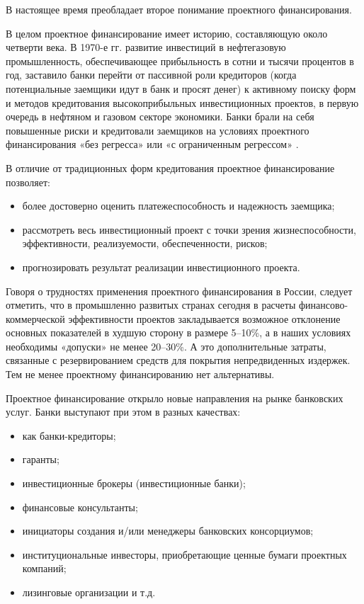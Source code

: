 В настоящее время преобладает второе понимание проектного финансирования.

В целом проектное финансирование имеет историю, составляющую около четверти века.
В 1970-е гг. развитие инвестиций в нефтегазовую промышленность, обеспечивающее прибыльность в сотни и тысячи процентов в год, заставило банки перейти от пассивной роли кредиторов (когда потенциальные заемщики идут в банк и просят денег) к активному поиску форм и методов кредитования высокоприбыльных инвестиционных проектов, в первую очередь в нефтяном и газовом секторе экономики.
Банки брали на себя повышенные риски и кредитовали заемщиков на условиях проектного финансирования «без регресса» или «с ограниченным регрессом» \cite[289--291]{mazur}.

В отличие от традиционных форм кредитования проектное финансирование позволяет:
\begin{itemize}
	\item более достоверно оценить платежеспособность и надежность заемщика;
	\item рассмотреть весь инвестиционный проект с точки зрения жизнеспособности, эффективности, реализуемости, обеспеченности, рисков;
	\item прогнозировать результат реализации инвестиционного проекта.
\end{itemize}

Говоря о трудностях применения проектного финансирования в России, следует отметить, что в промышленно развитых странах сегодня в расчеты финансово-коммерческой эффективности проектов закладывается возможное отклонение основных показателей в худшую сторону в размере 5--10\%, а в наших условиях необходимы «допуски» не менее 20--30\%.
А это дополнительные затраты, связанные с резервированием средств для покрытия непредвиденных издержек.
Тем не менее проектному финансированию нет альтернативы.

Проектное финансирование открыло новые направления на рынке банковских услуг.
Банки выступают при этом в разных качествах:
\begin{itemize}
	\item  как банки-кредиторы;
	\item  гаранты;
	\item  инвестиционные брокеры (инвестиционные банки);
	\item  финансовые консультанты;
	\item  инициаторы создания и/или менеджеры банковских консорциумов;
	\item  институциональные инвесторы, приобретающие ценные бумаги проектных компаний;
	\item  лизинговые организации и т.д.
\end{itemize}

